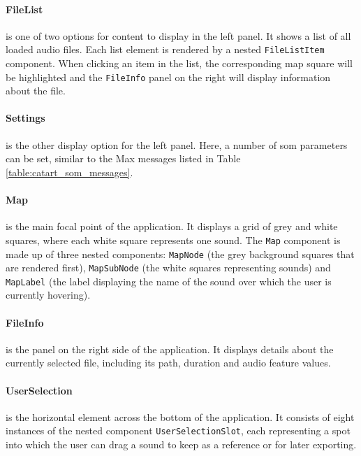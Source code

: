 \paragraph*{FileList}
\label{para:file_list}
is one of two options for content to display in the left panel. It shows a list
of all loaded audio files. Each list element is rendered by a nested
\texttt{FileListItem} component. When clicking an item in the list, the
corresponding map square will be highlighted and the \texttt{FileInfo}
panel on the right will display information about the file.

\paragraph*{Settings}
\label{para:settings}
is the other display option for the left panel. Here, a number of \gls{som}
parameters can be set, similar to the Max messages listed in Table
\ref{table:catart_som_messages}.

\paragraph*{Map}
\label{para:map}
is the main focal point of the application. It displays a grid of grey and white
squares, where each white square represents one sound. The \texttt{Map}
component is made up of three nested components: \texttt{MapNode} (the
grey background squares that are rendered first), \texttt{MapSubNode}
(the white squares representing sounds) and \texttt{MapLabel} (the
label displaying the name of the sound over which the user is currently
hovering).

\paragraph*{FileInfo}
\label{para:file_info}
is the panel on the right side of the application. It displays details about the
currently selected file, including its path, duration and audio feature values.

\paragraph*{UserSelection}
\label{para:user_selection}
is the horizontal element across the bottom of the application. It consists of
eight instances of the nested component \texttt{UserSelectionSlot},
each representing a spot into which the user can drag a sound to keep as a
reference or for later exporting.

